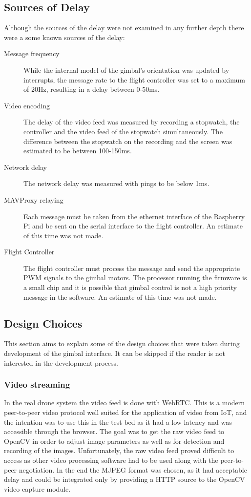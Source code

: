 \documentclass[nofilelist]{cslthse-msc}
\begin{document}
\subsection{Sources of Delay}
Although the sources of the delay were not examined in any further depth there were a some known sources of the delay:
\begin{description}
   \item[Message frequency] 
   While the internal model of the gimbal's orientation was updated by interrupts, the message rate to the flight controller was set to a maximum of 20Hz, resulting in a delay between 0-50ms.
   
   \item [Video encoding]
   The delay of the video feed was measured by recording a stopwatch, the controller and the video feed of the stopwatch simultaneously. The difference between the stopwatch on the recording and the screen was estimated to be between 100-150ms.
   
   \item [Network delay] 
   The network delay was measured with pings to be below 1ms. 

   \item[MAVProxy relaying] Each message must be taken from the ethernet interface of the Raspberry Pi and be sent on the serial interface to the flight controller. An estimate of this time was not made.
   
   \item[Flight Controller] The flight controller must process the message and send the appropriate PWM signals to the gimbal motors. The processor running the firmware is a small chip and it is possible that gimbal control is not a high priority message in the software. An estimate of this time was not made.
\end{description}

\subsection{Design Choices} 
This section aims to explain some of the design choices that were taken during development of the gimbal interface. It can be skipped if the reader is not interested in the development process.

\subsubsection{Video streaming}
In the real drone system the video feed is done with WebRTC. This is a modern peer-to-peer video protocol well suited for the application of video from IoT, and the intention was to use this in the test bed as it had a low latency and was accessible through the browser. The goal was to get the raw video feed to OpenCV in order to adjust image parameters as well as for detection and recording of the images. Unfortunately, the raw video feed proved difficult to access as other video processing software had to be used along with the peer-to-peer negotiation. In the end the MJPEG format was chosen, as it had acceptable delay and could be integrated only by providing a HTTP source to the OpenCV video capture module.
\end{document}
